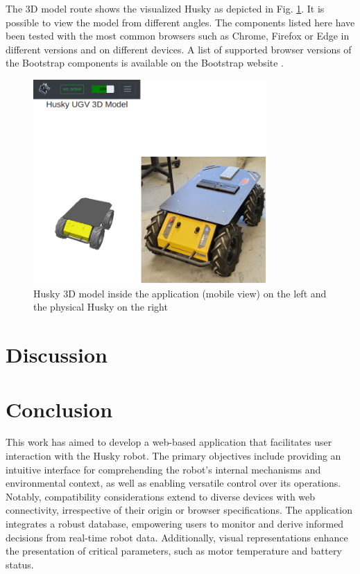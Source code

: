 \documentclass[conference]{IEEEtran}
\begin{document}
The 3D model route shows the visualized Husky as depicted in Fig. \ref{fig:3dreal}. It is possible to view the model from different angles.
The components listed here have been tested with the most common browsers such as Chrome, Firefox or Edge in different versions and on different devices. A list of supported browser versions of the Bootstrap components is available on the Bootstrap website \cite{bsBrowsers}. 
\begin{figure}[htbp]
    \centerline{\includegraphics[width=8.9cm]{Pictures/3dreal.png}}
    \caption{Husky 3D model inside the application (mobile view) on the left and the physical Husky on the right}
    \label{fig:3dreal}
\end{figure}

\section{Discussion}


\section{Conclusion}
This work has aimed to develop a web-based application that facilitates user interaction with the Husky robot. The primary objectives include providing an intuitive interface for comprehending the robot's internal mechanisms and environmental context, as well as enabling versatile control over its operations. 
Notably, compatibility considerations extend to diverse devices with web connectivity, irrespective of their origin or browser specifications. The application integrates a robust database, empowering users to monitor and derive informed decisions from real-time robot data. 
Additionally, visual representations enhance the presentation of critical parameters, such as motor temperature and battery status.
\end{document}
